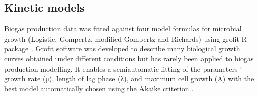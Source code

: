 \subsection{Kinetic models}
Biogas production data was fitted against four model formulas for microbial growth (Logistic, Gompertz, modified Gompertz and Richards) using grofit R package \cite{Kahm_2010}. Grofit software was developed to describe many biological growth curves obtained under different conditions but has rarely been applied to biogas production modelling. It enables a semiautomatic fitting of the parameters ’ growth rate (μ), length of lag phase (λ), and maximum cell growth (A) with the best model automatically chosen using the Akaike criterion \cite{Hasenbrink_2006}.